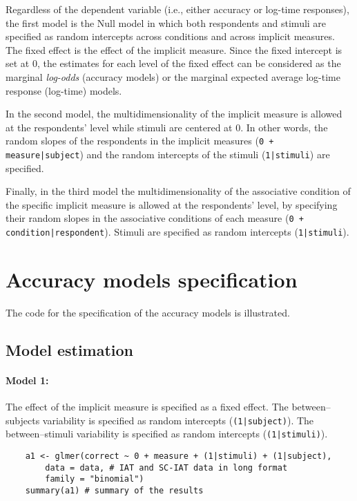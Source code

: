 \documentclass[12pt]{book}
\begin{document}
Regardless of the dependent variable (i.e., either accuracy or log-time responses), the first model is the Null model in which both respondents and stimuli are specified as random intercepts across conditions and across implicit measures. The fixed effect is the effect of the implicit measure. 
Since the fixed intercept is set at 0, the estimates for each level of the fixed effect can be considered as the marginal \emph{log-odds} (accuracy models) or the marginal expected average log-time response (log-time) models. 

In the second model, the multidimensionality of the implicit measure is allowed at the respondents' level while stimuli are centered at 0. 
In other words, the random slopes of the respondents in the implicit measures (\texttt{0 + measure|subject}) and the random intercepts of the stimuli (\texttt{1|stimuli}) are specified.

Finally, in the third model the multidimensionality of the associative condition of the specific implicit measure is allowed at the respondents' level, by specifying their random slopes in the associative conditions of each measure (\texttt{0 + condition|respondent}). Stimuli are specified as random intercepts (\texttt{1|stimuli}).

\section{Accuracy models specification}

The code for the specification of the accuracy models is illustrated. 

\subsection{Model estimation}

\paragraph*{Model 1:} 
The effect of the implicit measure is specified as a fixed effect.
The between--subjects variability is specified as random intercepts (\texttt{(1|subject)}). 
The between--stimuli variability is specified as random intercepts (\texttt{(1|stimuli)}).
%
\begin{lstlisting}
	a1 <- glmer(correct ~ 0 + measure + (1|stimuli) + (1|subject), 
		data = data, # IAT and SC-IAT data in long format
		family = "binomial")
	summary(a1) # summary of the results  
\end{lstlisting}
\end{document}
